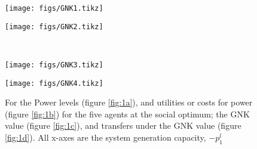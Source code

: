

\begin{figure}[]
	
	\begin{minipage}[t]{.48\linewidth}
		\texttt{[image: figs/GNK1.tikz]}%
\label{fig:1a}
	\end{minipage}
	\begin{minipage}[t]{.48\linewidth}
		\texttt{[image: figs/GNK2.tikz]}%
\label{fig:1b}
	\end{minipage}
\vspace{5mm}\\
	\begin{minipage}[t]{.48\linewidth}
		\texttt{[image: figs/GNK3.tikz]}%
\label{fig:1c}
	\end{minipage}
	\begin{minipage}[t]{.48\linewidth}
		\texttt{[image: figs/GNK4.tikz]}%
\label{fig:1d}
	\end{minipage}
	\vspace{0.3\baselineskip}
	\caption[Power-levels and utility imputations under GNK value for example network]{For the Power levels (figure \ref{fig:1a}), and utilities or costs for power (figure \ref{fig:1b}) for the five agents at the social optimum; the GNK value (figure \ref{fig:1c}), and transfers under the GNK value (figure \ref{fig:1d}). All x-axes are the system generation capacity, $-p_1^l$}\label{fig:1}
\end{figure}





